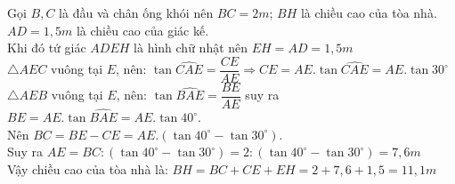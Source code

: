 \begin{ex}
{\begin{center}
	\end{center}
	Gọi $B,C$ là đầu và chân ống khói nên $BC=2m$; $BH$ là chiều cao của tòa nhà.\\
	$AD=1,5m$ là chiều cao của giác kế.\\
	Khi đó tứ giác $ADEH$ là hình chữ nhật nên $EH=AD=1,5m$\\
	$\triangle AEC$ vuông tại $E$, nên: $\tan \widehat{CAE}=\dfrac{CE}{AE}\Rightarrow CE=AE.\tan \widehat{CAE}=AE.\tan 30^\circ$\\
	$\triangle AEB$ vuông tại $E$, nên: $\tan \widehat{BAE}=\dfrac{BE}{AE}$ suy ra $BE=AE.\tan \widehat{BAE}=AE.\tan 40^\circ$.\\
	Nên $BC=BE-CE=AE.\left(\tan 40^\circ-\tan 30^\circ\right)$.\\
	Suy ra $AE=BC:\left(\tan 40^\circ-\tan 30^\circ\right)=2:\left(\tan 40^\circ-\tan 30^\circ\right)=7,6m$\\
	Vậy chiều cao của tòa nhà là: $BH=BC+CE+EH=2+7,6+1,5=11,1m$}
\end{ex}

